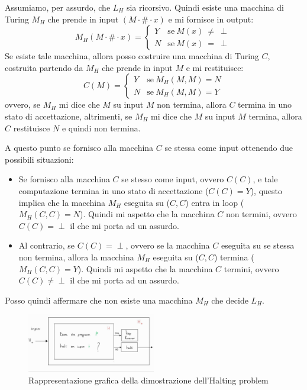 \begin{dimostrazione}
    Assumiamo, per assurdo, che $L_H$ sia ricorsivo. Quindi esiste una macchina
    di Turing $M_H$ che prende in input $(M \cdot \# \cdot x)$ e mi fornisce in
    output:
    \begin{equation}
        M_H (M \cdot \# \cdot x) = \begin{cases}
            Y & \text{se} \ M(x) \ \neq \ \perp \\
            N & \text{se} \ M(x) \  = \ \perp
        \end{cases}
    \end{equation}
    Se esiste tale macchina, allora posso costruire una macchina di Turing $C$,
    costruita partendo da $M_H$ che prende in input $M$ e mi restituisce:
    \begin{equation}
        C(M) = \begin{cases}
            Y & \text{se} \ M_H(M, M) = N \\
            N & \text{se} \ M_H(M, M) = Y
        \end{cases}
    \end{equation}
    ovvero, se $M_H$ mi dice che $M$ su input $M$ non termina, allora $C$ termina
    in uno stato di accettazione, altrimenti, se $M_H$ mi dice che $M$ su input
    $M$ termina, allora $C$ restituisce $N$ e quindi non termina.

    A questo punto se fornisco alla macchina $C$ se stessa come input ottenendo
    due possibili situazioni:
    \begin{itemize}
        \item Se fornisco alla macchina $C$ se stesso come input, ovvero $C(C)$,
              e tale computazione termina in uno stato di accettazione ($C(C) = Y$),
              questo implica che la macchina $M_H$ eseguita su ($C, C$) entra in
              loop ($M_H(C, C) = N$). Quindi mi aspetto che la macchina $C$ non
              termini, ovvero $C(C) = \perp$ il che mi porta ad un assurdo.
        \item Al contrario, se $C(C) = \perp$, ovvero se la macchina $C$ eseguita su
              se stessa non termina, allora la macchina $M_H$ eseguita su ($C, C$)
              termina ($M_H(C, C) = Y$). Quindi mi aspetto che la macchina $C$
              termini, ovvero $C(C) \neq \perp$ il che mi porta ad un assurdo.
    \end{itemize}
    Posso quindi affermare che non esiste una macchina $M_H$ che decide $L_H$.
    \begin{figure}[!ht]
        \centering
        \includegraphics[width=0.5\textwidth]{img/MacchineTuring/halt.png}
        \caption{Rappresentazione grafica della dimostrazione dell'Halting problem}
    \end{figure}
\end{dimostrazione}
